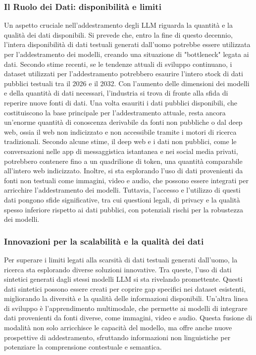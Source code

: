 \documentclass[target=mst,aauheader=,style=]{thud}
\begin{document}
\subsubsection{Il Ruolo dei Dati: disponibilità e limiti}
Un aspetto cruciale nell'addestramento degli LLM riguarda la quantità e la qualità dei dati disponibili. Si prevede che, entro la fine di questo decennio, l’intera disponibilità di dati testuali generati dall’uomo potrebbe essere utilizzata per l'addestramento dei modelli, creando una situazione di "bottleneck" legata ai dati. Secondo stime recenti, se le tendenze attuali di sviluppo continuano, i dataset utilizzati per l’addestramento potrebbero esaurire l'intero stock di dati pubblici testuali tra il 2026 e il 2032.
Con l'aumento delle dimensioni dei modelli e della quantità di dati necessari, l’industria si trova di fronte alla sfida di reperire nuove fonti di dati. Una volta esauriti i dati pubblici disponibili, che costituiscono la base principale per l'addestramento attuale, resta ancora un'enorme quantità di conoscenza derivabile da fonti non pubbliche o dal deep web, ossia il web non indicizzato e non accessibile tramite i motori di ricerca tradizionali. Secondo alcune stime, il deep web e i dati non pubblici, come le conversazioni nelle app di messaggistica istantanea e nei social media privati, potrebbero contenere fino a un quadrilione di token, una quantità comparabile all'intero web indicizzato. Inoltre, si sta esplorando l'uso di dati provenienti da fonti non testuali come immagini, video e audio, che possono essere integrati per arricchire l'addestramento dei modelli. Tuttavia, l’accesso e l’utilizzo di questi dati pongono sfide significative, tra cui questioni legali, di privacy e la qualità spesso inferiore rispetto ai dati pubblici, con potenziali rischi per la robustezza dei modelli.\cite{villalobos_2024}

\subsubsection{Innovazioni per la scalabilità e la qualità dei dati}
Per superare i limiti legati alla scarsità di dati testuali generati dall’uomo, la ricerca sta esplorando diverse soluzioni innovative. Tra queste, l’uso di dati sintetici generati dagli stessi modelli LLM si sta rivelando promettente. Questi dati sintetici possono essere creati per coprire gap specifici nei dataset esistenti, migliorando la diversità e la qualità delle informazioni disponibili.\cite{villalobos_2024} Un’altra linea di sviluppo è l’apprendimento multimodale, che permette ai modelli di integrare dati provenienti da fonti diverse, come immagini, video e audio. Questa fusione di modalità non solo arricchisce le capacità del modello, ma offre anche nuove prospettive di addestramento, sfruttando informazioni non linguistiche per potenziare la comprensione contestuale e semantica.\cite{naveed_2024}
\end{document}
